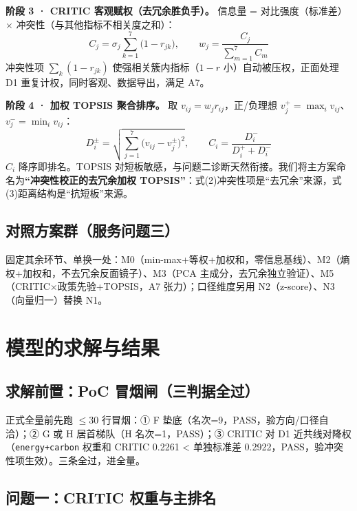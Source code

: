 \documentclass[12pt,a4paper]{ctexart}
\begin{document}
\textbf{阶段 3 · CRITIC 客观赋权（去冗余胜负手）。} 信息量 = 对比强度（标准差）$\times$ 冲突性（与其他指标不相关度之和）：
\begin{equation}
C_j=\sigma_j\sum_{k=1}^{7}\bigl(1-r_{jk}\bigr),\qquad
w_j=\frac{C_j}{\sum_{m=1}^{7}C_m}
\end{equation}
冲突性项 $\sum_k(1-r_{jk})$ 使强相关簇内指标（$1-r$ 小）自动被压权，正面处理 D1 重复计权，同时客观、数据导出，满足 A7。

\textbf{阶段 4 · 加权 TOPSIS 聚合排序。} 取 $v_{ij}=w_j r_{ij}$，正/负理想 $v_j^+=\max_i v_{ij}$、$v_j^-=\min_i v_{ij}$：
\begin{equation}
D_i^{\pm}=\sqrt{\sum_{j=1}^{7}\bigl(v_{ij}-v_j^{\pm}\bigr)^2},\qquad
C_i=\frac{D_i^-}{D_i^++D_i^-}
\end{equation}
$C_i$ 降序即排名。TOPSIS 对短板敏感，与问题二诊断天然衔接。我们将主方案命名为\textbf{``冲突性校正的去冗余加权 TOPSIS''}：式(2)冲突性项是``去冗余''来源，式(3)距离结构是``抗短板''来源。

\subsection{对照方案群（服务问题三）}

固定其余环节、单换一处：M0（min-max+等权+加权和，零信息基线）、M2（熵权+加权和，不去冗余反面镜子）、M3（PCA 主成分，去冗余独立验证）、M5（CRITIC$\times$政策先验+TOPSIS，A7 张力）；口径维度另用 N2（z-score）、N3（向量归一）替换 N1。

\section{模型的求解与结果}

\subsection{求解前置：PoC 冒烟闸（三判据全过）}

正式全量前先跑 $\leq30$ 行冒烟：① F 垫底（名次=9，PASS，验方向/口径自洽）；② G 或 H 居首梯队（H 名次=1，PASS）；③ CRITIC 对 D1 近共线对降权（\texttt{energy+carbon} 权重和 CRITIC 0.2261 < 单独标准差 0.2922，PASS，验冲突性项生效）。三条全过，进全量。

\subsection{问题一：CRITIC 权重与主排名}
\end{document}
